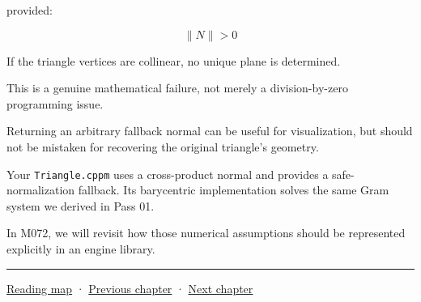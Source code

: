 provided:

\[
\|N\|>0
\]

If the triangle vertices are collinear, no unique plane is determined.

This is a genuine mathematical failure, not merely a division-by-zero programming issue.

Returning an arbitrary fallback normal can be useful for visualization, but should not be mistaken for recovering the original triangle's geometry.

Your \texttt{Triangle.cppm} uses a cross-product normal and provides a safe-normalization fallback. Its barycentric implementation solves the same Gram system we derived in Pass 01.

In M072, we will revisit how those numerical assumptions should be represented explicitly in an engine library.

\begin{center}\rule{0.5\linewidth}{0.5pt}\end{center}

\hyperref[volume-reading-map]{Reading map} · \hyperref[03-visual-computing-i-ch021-collision-implementations-and-repository-comparison]{Previous chapter} · \hyperref[04-visual-computing-ii-ch023-mesh-topology-and-connectivity]{Next chapter}
